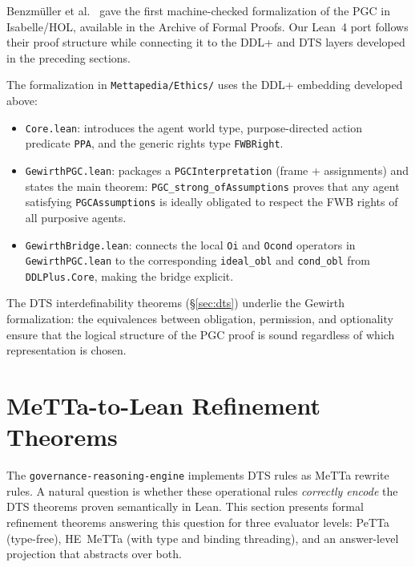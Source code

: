 \documentclass[]{article}
\newcommand{\code}[1]{\texttt{#1}}
\newcommand{\DDL}{\textup{DDL+}}
\newcommand{\DTS}{\textup{DTS}}
\newcommand{\PGC}{\textup{PGC}}
\begin{document}
Benzm{\"u}ller et al.\ \cite{Benzmuller2019PGC} gave the first machine-checked
formalization of the \PGC{} in Isabelle/HOL, available in the Archive of Formal Proofs.
Our Lean~4 port follows their proof structure while connecting it to the \DDL{}
and \DTS{} layers developed in the preceding sections.

The formalization in \code{Mettapedia/Ethics/} uses the \DDL{} embedding
developed above:

\begin{itemize}
\item \code{Core.lean}: introduces the agent world type, purpose-directed
      action predicate \code{PPA}, and the generic rights type \code{FWBRight}.
\item \code{GewirthPGC.lean}: packages a \code{PGCInterpretation} (frame +
      assignments) and states the main theorem:
      \code{PGC\_strong\_ofAssumptions} proves that any agent satisfying
      \code{PGCAssumptions} is ideally obligated to respect the FWB rights
      of all purposive agents.
\item \code{GewirthBridge.lean}: connects the local \code{Oi} and \code{Ocond}
      operators in \code{GewirthPGC.lean} to the corresponding \code{ideal\_obl}
      and \code{cond\_obl} from \code{DDLPlus.Core}, making the bridge explicit.
\end{itemize}

\noindent
The \DTS{} interdefinability theorems (§\ref{sec:dts}) underlie the Gewirth
formalization: the equivalences between obligation, permission, and optionality
ensure that the logical structure of the PGC proof is sound regardless of which
representation is chosen.

\section{MeTTa-to-Lean Refinement Theorems}
\label{sec:refinement}

The \code{governance-reasoning-engine} \cite{GovReasoningEngine} implements
\DTS{} rules as MeTTa rewrite rules.  A natural question is whether these
operational rules \emph{correctly encode} the \DTS{} theorems proven
semantically in Lean.  This section presents formal refinement theorems
answering this question for three evaluator levels: PeTTa (type-free),
HE~MeTTa (with type and binding threading), and an answer-level projection
that abstracts over both.
\end{document}
